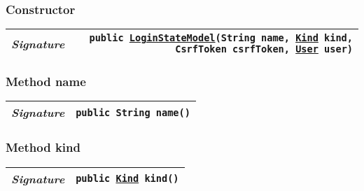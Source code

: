\begin{adjustwidth}{1.5em}{0pt}
\begin{adjustwidth}{1.5em}{0pt}
{\begin{tabularx}{1.0\linewidth}{@{}l R@{}}
    \end{tabularx}}\subsubsection{Constructor\label{edu.kit.hci.soli.dto.LoginStateModel@edu.kit.hci.soli.dto.LoginStateModel(java.lang.String,edu.kit.hci.soli.dto.LoginStateModel.Kind,org.springframework.security.web.csrf.CsrfToken,edu.kit.hci.soli.domain.User)}}
    \begin{adjustwidth}{1.5em}{0pt}
      {\begin{tabularx}{1.0\linewidth}{@{}l R@{}}
        \emph{Signature} & \texttt{public \texttt{\hyperref[edu.kit.hci.soli.dto.LoginStateModel]{\texttt{LoginStateModel}}}(\texttt{String} name, \texttt{\hyperref[edu.kit.hci.soli.dto.LoginStateModel.Kind]{\texttt{Kind}}} kind, \texttt{CsrfToken} csrfToken, \texttt{\hyperref[edu.kit.hci.soli.domain.User]{\texttt{User}}} user)} \\
        \hline
  
      \end{tabularx}}
    \end{adjustwidth}\subsubsection{Method name\label{edu.kit.hci.soli.dto.LoginStateModel@name()}}
    \begin{adjustwidth}{1.5em}{0pt}
      {\begin{tabularx}{1.0\linewidth}{@{}l R@{}}
        \emph{Signature} & \texttt{public \texttt{String} name()} \\
        \hline
  
      \end{tabularx}}
    \end{adjustwidth}\subsubsection{Method kind\label{edu.kit.hci.soli.dto.LoginStateModel@kind()}}
    \begin{adjustwidth}{1.5em}{0pt}
      {\begin{tabularx}{1.0\linewidth}{@{}l R@{}}
        \emph{Signature} & \texttt{public \texttt{\hyperref[edu.kit.hci.soli.dto.LoginStateModel.Kind]{\texttt{Kind}}} kind()} \\
        \hline
  

\end{tabularx}}
\end{adjustwidth}
\end{adjustwidth}
\end{adjustwidth}
